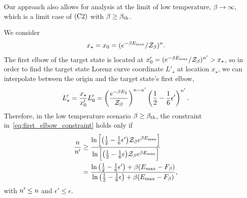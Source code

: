 \documentclass[pra,
aps,
twocolumn,
superscriptaddress,
groupedaddress,
nofootinbib,
reprint
]{revtex4-1}
\begin{document}
Our approach also allows for analysis at the limit of low temperature, $\beta \rightarrow \infty$, which is a limit case of $\rm{(C2)}$ with $\beta \geq \beta_{\rm{th}}$.

We consider 
\begin{equation}
	x_\star = x_0 = (e^{-\beta E_{\rm{max}}} / \Z_\beta)^{n}.
\end{equation}
The first elbow of the target state is located at $x'_0 = (e^{-\beta E_{\rm{max}}} / \Z_\beta)^{\tt} > x_\star$, so in order to find the target state Lorenz curve coordinate $L'_\star$ at location $x_\star$, we can interpolate between the origin and the target state's first elbow, 
\begin{equation}\label{eq:constraint_deriv_lowtemp}
	L'_\star = \frac{x_\star}{x'_0}L'_0 = \left(\frac{e^{-\beta E_2}}{\Z_\beta}\right)^{n-\tt} \left( \frac{1}{2} - \frac{1}{6}\epsilon' \right)^{\tt}.
\end{equation}
Therefore, in the low temperature scenario $\beta \geq \beta_{\rm{th}}$, the constraint in~\cref{eq:first_elbow_constraint} holds only if
\begin{align}
	\frac{n}{n'} &\geq \frac{\ln{\Big[ \big( \frac{1}{2}-\frac{1}{6}\epsilon' \big)\Z_\beta e^{\beta E_{\rm{max}}} \Big]}}{\ln{\Big[ \big( \frac{1}{2}-\frac{1}{6}\epsilon \big)\Z_\beta e^{\beta E_{\rm{max}}} \Big]}} \nonumber\\
	&= \frac{\ln{\big( \frac{1}{2}-\frac{1}{6}\epsilon' \big)} + \beta (E_{\rm{max}} - F_\beta)}{\ln{\big( \frac{1}{2}-\frac{1}{6}\epsilon \big)} + \beta (E_{\rm{max}} - F_\beta)},
\end{align}
with $\tt \leq n$ and $\epsilon' \leq \epsilon$.
\end{document}
